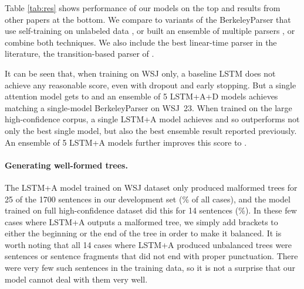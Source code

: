 \documentclass{article} \usepackage{nips15submit_e,times}
\newcommand\citet\cite
\newcommand\citep\cite
\begin{document}
Table \ref{tab:res} shows performance of our models on the top and results
from other papers at the bottom.
We compare to variants of the BerkeleyParser that use
self-training on unlabeled data \citep{huang-harper:2009:EMNLP}, or built an ensemble
of multiple parsers \citep{petrov:2010:NAACL}, or combine both techniques.
We also include the best linear-time parser in the literature,
the transition-based parser of \citet{zhu-EtAl:2013:ACL}.

It can be seen that, when training on WSJ only, a baseline LSTM does not
achieve any reasonable score, even with dropout and early stopping.
But a single attention model gets to  and an ensemble of 5 LSTM+A+D models
achieves  matching a single-model BerkeleyParser on WSJ~23.
When trained on the large high-confidence corpus, a single LSTM+A model
achieves  and so outperforms not only the best single model, but also
the best ensemble result reported previously. An ensemble of 5 LSTM+A models
further improves this score to .

\paragraph{Generating well-formed trees.}
The LSTM+A model trained on WSJ dataset only produced malformed trees
for 25 of the 1700 sentences in our development set (\% of all cases),
and the model trained on full high-confidence dataset did this for 14
sentences (\%). In these few cases where LSTM+A outputs a malformed tree,
we simply add brackets to either the beginning or the end of the tree
in order to make it balanced. It is worth noting that all 14 cases where
LSTM+A produced unbalanced trees were sentences or sentence fragments that did not
end with proper punctuation. There were very few such sentences in the training data,
so it is not a surprise that our model cannot deal with them very well.
\end{document}
